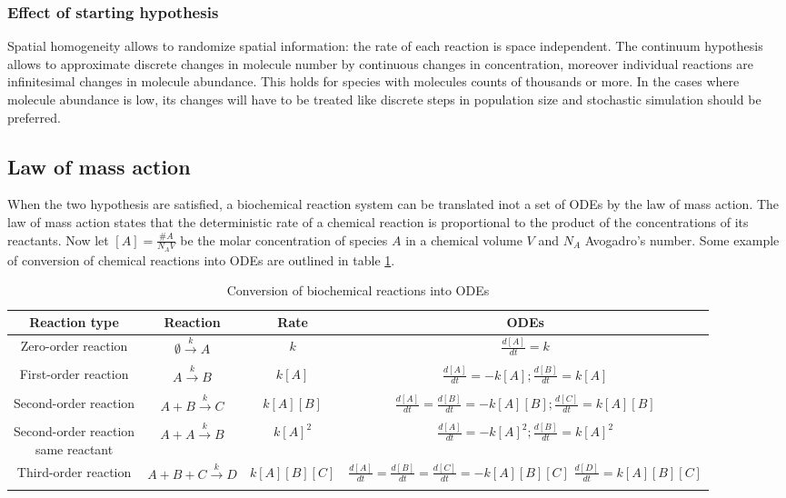     \subsubsection{Effect of starting hypothesis}
    Spatial homogeneity allows to randomize spatial information: the rate of each reaction is space independent.
    The continuum hypothesis allows to approximate discrete changes in molecule number by continuous changes in concentration, moreover individual reactions are infinitesimal changes in molecule abundance.
    This holds for species with molecules counts of thousands or more.
    In the cases where molecule abundance is low, its changes will have to be treated like discrete steps in population size and stochastic simulation should be preferred.

  \subsection{Law of mass action}
  When the two hypothesis are satisfied, a biochemical reaction system can be translated inot a set of ODEs by the law of mass action.
  The law of mass action states that the deterministic rate of a chemical reaction is proportional to the product of the concentrations of its reactants.
  Now let $[A] = \frac{\# A}{N_AV}$ be the molar concentration of species $A$ in a chemical volume $V$ and $N_A$ Avogadro's number.
  Some example of conversion of chemical reactions into ODEs are outlined in table \ref{tab:chem-odes}.

  \begin{table}[H]
    \centering
    \begin{tabular}{c c c c}
      \hline
      Reaction type & Reaction & Rate & ODEs\\
      \hline
      Zero-order reaction & $\emptyset\xrightarrow[]{k} A$ & $k$ & $\frac{d[A]}{dt} = k$\\
      First-order reaction & $A\xrightarrow[]{k} B$ & $k[A]$ & $\frac{d[A]}{dt} = -k[A];\frac{d[B]}{dt} = k[A]$\\
      Second-order reaction & $A+B\xrightarrow[]{k} C$ & $k[A][B]$ & $\frac{d[A]}{dt} = \frac{d[B]}{dt} = -k[A][B];\frac{d[C]}{dt} = k[A][B]$\\
      \makecell{Second-order reaction\\ same reactant} & $A+A\xrightarrow[]{k} B$ & $k[A]^2$ & $\frac{d[A]}{dt} = -k[A]^2;\frac{d[B]}{dt} = k[A]^2$\\
      Third-order reaction & $A+B+C\xrightarrow[]{k} D$ & $k[A][B][C]$ & \makecell{$\frac{d[A]}{dt} = \frac{d[B]}{dt} = \frac{d[C]}{dt} =  -k[A][B][C]$\\$\frac{d[D]}{dt} = k[A][B][C]$}\\
      \hline
    \end{tabular}
    \caption{Conversion of biochemical reactions into ODEs}
    \label{tab:chem-odes}
  \end{table}


